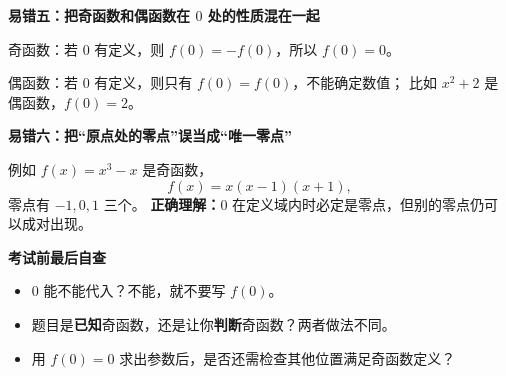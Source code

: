 \clearpage
\begin{trapbox}
\textbf{\textcolor{CTrap}{易错五：把奇函数和偶函数在 $0$ 处的性质混在一起}}



  奇函数：若 $0$ 有定义，则 $f(0)=-f(0)$，所以 $f(0)=0$。

  偶函数：若 $0$ 有定义，则只有 $f(0)=f(0)$，不能确定数值；
  比如 $x^2+2$ 是偶函数，$f(0)=2$。

  \medskip
  
\end{trapbox}
\clearpage
\begin{trapbox}
\textbf{\textcolor{CTrap}{易错六：把“原点处的零点”误当成“唯一零点”}}



  例如 $f(x)=x^3-x$ 是奇函数，
  \[
    f(x)=x(x-1)(x+1),
  \]
  零点有 $-1,0,1$ 三个。
  \textbf{正确理解：}$0$ 在定义域内时必定是零点，但别的零点仍可以成对出现。

  \medskip
  \textbf{\textcolor{CTrap}{考试前最后自查}}

  \begin{itemize}[leftmargin=*, itemsep=0.4em, topsep=0.3em]
    \item $0$ 能不能代入？不能，就不要写 $f(0)$。
    \item 题目是\textbf{已知}奇函数，还是让你\textbf{判断}奇函数？两者做法不同。
    \item 用 $f(0)=0$ 求出参数后，是否还需检查其他位置满足奇函数定义？
  \end{itemize}
\end{trapbox}
